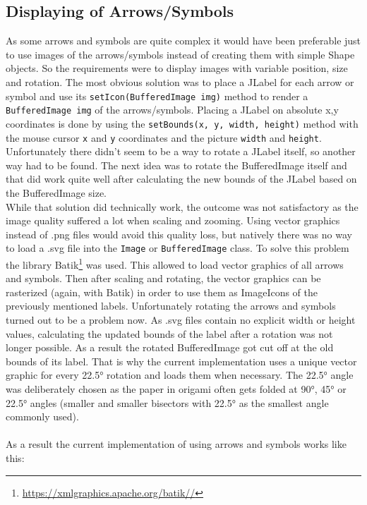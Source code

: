 \subsection{Displaying of Arrows/Symbols}
\label{sec:displaySymbols}
As some arrows and symbols are quite complex it would have been preferable just to use images of the arrows/symbols instead of creating them with simple Shape objects. So the requirements were to display images with variable position, size and rotation. The most obvious solution was to place a JLabel for each arrow or symbol and use its \texttt{setIcon(BufferedImage img)} method to render a \texttt{BufferedImage img} of the arrows/symbols. Placing a JLabel on absolute x,y coordinates is done by using the \texttt{setBounds(x, y, width, height)} method with the mouse cursor \texttt{x} and \texttt{y} coordinates and the picture \texttt{width} and \texttt{height}. Unfortunately there didn't seem to be a way to rotate a JLabel itself, so another way had to be found. The next idea was to rotate the BufferedImage itself and that did work quite well after calculating the new bounds of the JLabel based on the BufferedImage size.\\
While that solution did technically work, the outcome was not satisfactory as the image quality suffered a lot when scaling and zooming. Using vector graphics instead of .png files would avoid this quality loss, but natively there was no way to load a .svg file into the \texttt{Image} or \texttt{BufferedImage} class. To solve this problem the library Batik\footnote{\url{https://xmlgraphics.apache.org/batik//}} was used. This allowed to load vector graphics of all arrows and symbols. Then after scaling and rotating, the vector graphics can be rasterized (again, with Batik) in order to use them as ImageIcons of the previously mentioned labels. Unfortunately rotating the arrows and symbols turned out to be a problem now. As .svg files contain no explicit width or height values, calculating the updated bounds of the label after a rotation was not longer possible. As a result the rotated BufferedImage got cut off at the old bounds of its label. That is why the current implementation uses a unique vector graphic for every 22.5° rotation and loads them when necessary. The 22.5° angle was deliberately chosen as the paper in origami often gets folded at 90°, 45° or 22.5° angles (smaller and smaller bisectors with 22.5° as the smallest angle commonly used).\\%
\\
As a result the current implementation of using arrows and symbols works like this:

